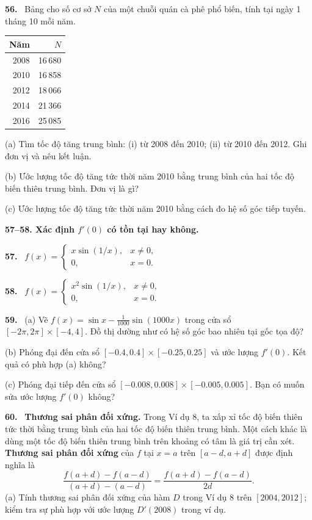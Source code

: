 \documentclass[12pt,a4paper]{article}
\newcommand{\bt}[1]{\par\smallskip\noindent\textbf{#1.}\ }
\newcommand{\group}[1]{\par\medskip\noindent\textbf{#1}\par\nopagebreak[4]}
\begin{document}
\bt{56} Bảng cho số cơ sở $N$ của một chuỗi quán cà phê phổ biến, tính tại ngày 1 tháng 10 mỗi năm.
\begin{center}\begin{tabular}{rr}\toprule Năm&$N$\\\midrule
2008&16\,680\\2010&16\,858\\2012&18\,066\\2014&21\,366\\2016&25\,085\\\bottomrule
\end{tabular}\end{center}
(a) Tìm tốc độ tăng trung bình: (i) từ 2008 đến 2010; (ii) từ 2010 đến 2012. Ghi đơn vị và nêu kết luận.

(b) Ước lượng tốc độ tăng tức thời năm 2010 bằng trung bình của hai tốc độ biến thiên trung bình. Đơn vị là gì?

(c) Ước lượng tốc độ tăng tức thời năm 2010 bằng cách đo hệ số góc tiếp tuyến.
\group{57–58. Xác định $f'(0)$ có tồn tại hay không.}
\bt{57} $\displaystyle f(x)=\begin{cases}x\sin(1/x),&x\ne0,\\0,&x=0.\end{cases}$
\bt{58} $\displaystyle f(x)=\begin{cases}x^2\sin(1/x),&x\ne0,\\0,&x=0.\end{cases}$
\bt{59} (a) Vẽ $f(x)=\sin x-\frac1{1000}\sin(1000x)$ trong cửa sổ $[-2\pi,2\pi]\times[-4,4]$. Đồ thị dường như có hệ số góc bao nhiêu tại gốc tọa độ?

(b) Phóng đại đến cửa sổ $[-0.4,0.4]\times[-0.25,0.25]$ và ước lượng $f'(0)$. Kết quả có phù hợp (a) không?

(c) Phóng đại tiếp đến cửa sổ $[-0.008,0.008]\times[-0.005,0.005]$. Bạn có muốn sửa ước lượng $f'(0)$ không?
\bt{60} \textbf{Thương sai phân đối xứng.} Trong Ví dụ 8, ta xấp xỉ tốc độ biến thiên tức thời bằng trung bình của hai tốc độ biến thiên trung bình. Một cách khác là dùng một tốc độ biến thiên trung bình trên khoảng có tâm là giá trị cần xét. \textbf{Thương sai phân đối xứng} của $f$ tại $x=a$ trên $[a-d,a+d]$ được định nghĩa là
\[\frac{f(a+d)-f(a-d)}{(a+d)-(a-d)}=\frac{f(a+d)-f(a-d)}{2d}.\]
(a) Tính thương sai phân đối xứng của hàm $D$ trong Ví dụ 8 trên $[2004,2012]$; kiểm tra sự phù hợp với ước lượng $D'(2008)$ trong ví dụ.
\end{document}
